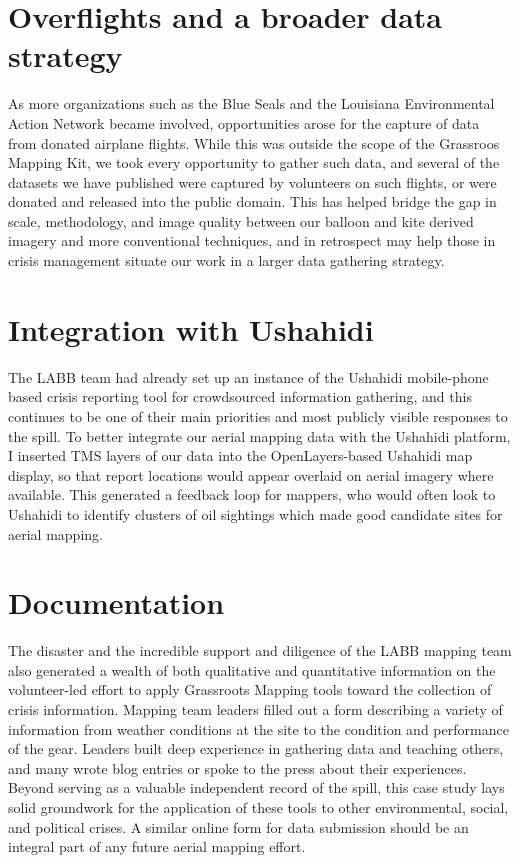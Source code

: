 \documentclass[11pt,oneside,notitlepage]{report}
\begin{document}
{{\section{Overflights and a broader data strategy}

As more organizations such as the Blue Seals and the Louisiana Environmental Action Network became involved, opportunities arose for the capture of data from donated airplane flights. While this was outside the scope of the Grassroos Mapping Kit, we took every opportunity to gather such data, and several of the datasets we have published were captured by volunteers on such flights, or were donated and released into the public domain. This has helped bridge the gap in scale, methodology, and image quality between our balloon and kite derived imagery and more conventional techniques, and in retrospect may help those in crisis management situate our work in a larger data gathering strategy. 

\section{Integration with Ushahidi}

The \ac{LABB} team had already set up an instance of the Ushahidi mobile-phone based crisis reporting tool for crowdsourced information gathering, and this continues to be one of their main priorities and most publicly visible responses to the spill. To better integrate our aerial mapping data with the Ushahidi platform, I inserted \ac{TMS} layers of our data into the OpenLayers-based Ushahidi map display, so that report locations would appear overlaid on aerial imagery where available. This generated a feedback loop for mappers, who would often look to Ushahidi to identify clusters of oil sightings which made good candidate sites for aerial mapping.

\section{Documentation}

The disaster and the incredible support and diligence of the LABB mapping team also generated a wealth of both qualitative and quantitative information on the volunteer-led effort to apply Grassroots Mapping tools toward the collection of crisis information. Mapping team leaders filled out a form describing a variety of information from weather conditions at the site to the condition and performance of the gear. Leaders built deep experience in gathering data and teaching others, and many wrote blog entries or spoke to the press about their experiences. Beyond serving as a valuable independent record of the spill, this case study lays solid groundwork for the application of these tools to other environmental, social, and political crises. A similar online form for data submission should be an integral part of any future aerial mapping effort.

}}
\end{document}
